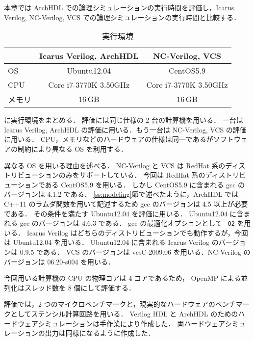 本章では ArchHDL での論理シミュレーションの実行時間を評価し，Icarus Verilog, NC-Verilog, VCS での論理シミュレーションの実行時間と比較する．

\begin{table}[t]
 \caption{実行環境}
 \label{table:exec_env}
 \begin{center}
  \begin{tabular}{l|c|c} \hline
         &  Icarus Verilog, ArchHDL  &  NC-Verilog, VCS   \\ \hline
  OS     &  Ubuntu12.04             &  CentOS5.9        \\
  CPU    &  Core i7-3770K 3.50GHz   &  Core i7-3770K 3.50GHz  \\
  メモリ  &  $16\,\mathrm{GB}$       &  $16\,\mathrm{GB}$  \\ \hline
  \end{tabular}
 \end{center}
\end{table}

 に実行環境をまとめる．
評価には同じ仕様の 2 台の計算機を用いる．
一台は Icarus Verilog, ArchHDL の評価に用いる．もう一台は NC-Verilog, VCS の評価に用いる．
CPU，メモリなどのハードウェアの仕様は同一であるがソフトウェアの制約により異なる OS を利用する．

異なる OS を用いる理由を述べる．
NC-Verilog と VCS は RedHat 系のディストリビューションのみをサポートしている．
今回は RedHat 系のディストリビューションである CentOS5.9 を用いる．
しかし CentOS5.9 に含まれる gcc のバージョンは 4.1.2 である．
\ref{ss:modeling}節で述べたように，ArchHDL では C++11 のラムダ関数を用いて記述するため gcc のバージョンは 4.5 以上が必要である．
その条件を満たす Ubuntu12.04 を評価に用いる．
Ubuntu12.04 に含まれる gcc のバージョンは 4.6.3 である．
gcc の最適化オプションとして \verb/-O2/ を用いる．
Icarus Verilog はどちらのディストリビューションでも動作するが，今回は Ubuntu12.04 を用いる．
Ubuntu12.04 に含まれる Icarus Verilog のバージョンは 0.9.5 である．
VCS のバージョンは vcsC-2009.06 を用いる．NC-Verilog のバージョンは 06.20-s004 を用いる．

今回用いる計算機の CPU の物理コアは 4 コアであるため， OpenMP による並列化はスレッド数を 8 個にして評価する．

評価では，2 つのマイクロベンチマークと，現実的なハードウェアのベンチマークとしてステンシル計算回路\cite{koba:stencil}を用いる．
Verilog HDL と ArchHDL のためのハードウェアシミュレーションは手作業により作成した．
両ハードウェアシミュレーションの出力は同様になるように作成した．

